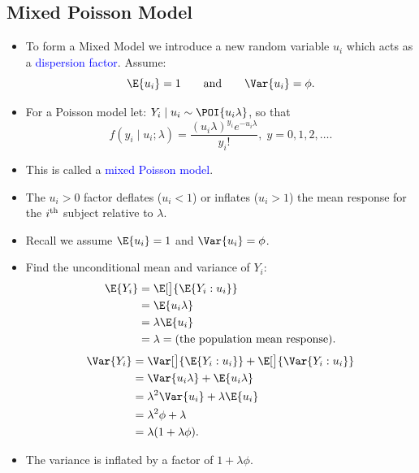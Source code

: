 \documentclass[oneside]{book}\usepackage[]{graphicx}\usepackage[svgnames]{xcolor}
\providecommand\given{} %
\renewcommand\given{\nonscript\:\delimsize\vert\nonscript\:\mathopen{}}%
\renewcommand\given{\nonscript\:\delimsize\vert\nonscript\:\mathopen{}}%
\renewcommand\given{\nonscript\:\delimsize\vert\nonscript\:\mathopen{}}%
\renewcommand\given{\nonscript\:\delimsize\vert\nonscript\:\mathopen{}}%
\renewcommand\given{\nonscript\:\delimsize\vert\nonscript\:\mathopen{}}%
\renewcommand\given{\nonscript\:\delimsize\vert\nonscript\:\mathopen{}}%
\renewcommand\given{\nonscript\:\delimsize\vert\nonscript\:\mathopen{}}%
\renewcommand\given{\nonscript\:\delimsize\vert\nonscript\:\mathopen{}}%
\renewcommand\given{\nonscript\:\delimsize\vert\nonscript\:\mathopen{}}%
\renewcommand\given{\nonscript\:\delimsize\vert\nonscript\:\mathopen{}}%
\renewcommand\given{\nonscript\:\delimsize\vert\nonscript\:\mathopen{}}%
\renewcommand\given{\nonscript\:\delimsize\vert\nonscript\:\mathopen{}}%
\renewcommand\given{:}
\begin{document}
\subsection*{Mixed Poisson Model}
\begin{itemize}
      \item To form a Mixed Model we introduce a new random variable $ u_i $ which acts as a
            \textcolor{Blue}{dispersion factor}. Assume:
            \[ \E{u_i}=1\qquad \text{and}\qquad \Var{u_i}=\phi. \]
      \item For a Poisson model let: $ Y_i\mid u_i \sim \POI{u_i\lambda} $, so that
            \[ f(y_i\mid u_i;\lambda)=\frac{(u_i\lambda)^{y_i}e^{-u_i\lambda}}{y_i!},\; y=0,1,2,\ldots. \]
      \item This is called a \textcolor{Blue}{mixed Poisson model}.
      \item The $ u_i>0 $ factor deflates ($ u_i<1 $) or inflates ($ u_i>1 $) the mean response for the $ i\textsuperscript{th} $ subject relative to $ \lambda $.
      \item Recall we assume $ \E{u_i}=1 $ and $ \Var{u_i}=\phi $.
      \item Find the unconditional mean and variance of $ Y_i $:
            \begin{align*}
                  \E{Y_i}
                   & =\E[\big]{\E{Y_i\given u_i}}                    \\
                   & =\E{u_i\lambda}                                 \\
                   & =\lambda\E{u_i}                                 \\
                   & =\lambda=\text{(the population mean response)}.
            \end{align*}
            \begin{align*}
                  \Var{Y_i}
                   & =\Var[\big]{\E{Y_i\given u_i}}+\E[\big]{\Var{Y_i\given u_i}} \\
                   & =\Var{u_i\lambda}+\E{u_i\lambda}                             \\
                   & =\lambda^2\Var{u_i}+\lambda\E{u_i}                           \\
                   & =\lambda^2 \phi+\lambda                                      \\
                   & =\lambda(1+\lambda \phi).
            \end{align*}
      \item The variance is inflated by a factor of $ 1+\lambda\phi $.

\end{itemize}
\end{document}
